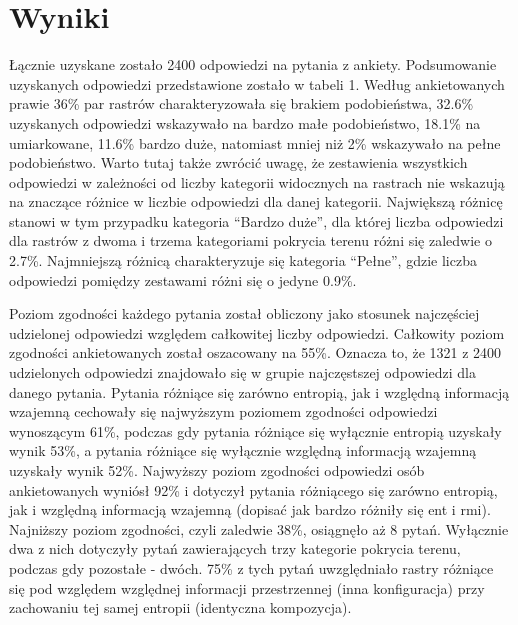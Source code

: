 \documentclass{amuthesis}
\begin{document}
\hypertarget{wyniki}{%
\section{Wyniki}\label{wyniki}}

Łącznie uzyskane zostało 2400 odpowiedzi na pytania z ankiety.
Podsumowanie uzyskanych odpowiedzi przedstawione zostało w tabeli 1.
Według ankietowanych prawie 36\% par rastrów charakteryzowała się
brakiem podobieństwa, 32.6\% uzyskanych odpowiedzi wskazywało na bardzo
małe podobieństwo, 18.1\% na umiarkowane, 11.6\% bardzo duże, natomiast
mniej niż 2\% wskazywało na pełne podobieństwo. Warto tutaj także
zwrócić uwagę, że zestawienia wszystkich odpowiedzi w zależności od
liczby kategorii widocznych na rastrach nie wskazują na znaczące różnice
w liczbie odpowiedzi dla danej kategorii. Największą różnicę stanowi w
tym przypadku kategoria ``Bardzo duże'', dla której liczba odpowiedzi
dla rastrów z dwoma i trzema kategoriami pokrycia terenu różni się
zaledwie o 2.7\%. Najmniejszą różnicą charakteryzuje się kategoria
``Pełne'', gdzie liczba odpowiedzi pomiędzy zestawami różni się o jedyne
0.9\%.

Poziom zgodności każdego pytania został obliczony jako stosunek
najczęściej udzielonej odpowiedzi względem całkowitej liczby odpowiedzi.
Całkowity poziom zgodności ankietowanych został oszacowany na 55\%.
Oznacza to, że 1321 z 2400 udzielonych odpowiedzi znajdowało się w
grupie najczęstszej odpowiedzi dla danego pytania. Pytania różniące się
zarówno entropią, jak i względną informacją wzajemną cechowały się
najwyższym poziomem zgodności odpowiedzi wynoszącym 61\%, podczas gdy
pytania różniące się wyłącznie entropią uzyskały wynik 53\%, a pytania
różniące się wyłącznie względną informacją wzajemną uzyskały wynik 52\%.
Najwyższy poziom zgodności odpowiedzi osób ankietowanych wyniósł 92\% i
dotyczył pytania różniącego się zarówno entropią, jak i względną
informacją wzajemną (dopisać jak bardzo różniły się ent i rmi).
Najniższy poziom zgodności, czyli zaledwie 38\%, osiągnęło aż 8 pytań.
Wyłącznie dwa z nich dotyczyły pytań zawierających trzy kategorie
pokrycia terenu, podczas gdy pozostałe - dwóch. 75\% z tych pytań
uwzględniało rastry różniące się pod względem względnej informacji
przestrzennej (inna konfiguracja) przy zachowaniu tej samej entropii
(identyczna kompozycja).
\end{document}
